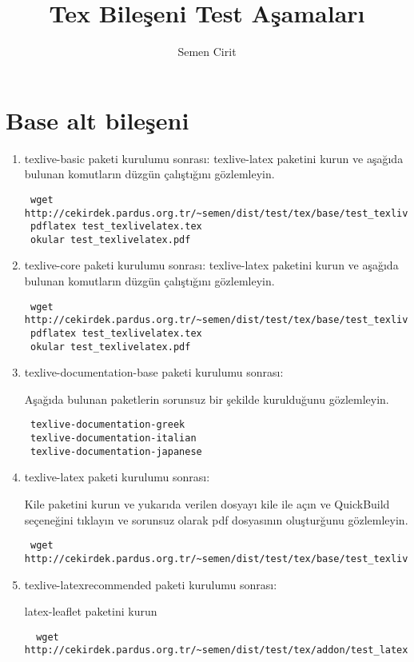 \documentclass[a4paper,10pt]{article}
\title{Tex Bileşeni Test Aşamaları}
\author{Semen Cirit}
\begin{document}
\maketitle

\section{Base alt bileşeni}
\begin{enumerate}
 \item texlive-basic paketi kurulumu sonrası:
 texlive-latex paketini kurun ve aşağıda bulunan komutların düzgün çalıştığını gözlemleyin.

\begin{verbatim}
 wget http://cekirdek.pardus.org.tr/~semen/dist/test/tex/base/test_texlivelatex.tex
 pdflatex test_texlivelatex.tex
 okular test_texlivelatex.pdf
\end{verbatim}

\item texlive-core paketi kurulumu sonrası:
 texlive-latex paketini kurun ve aşağıda bulunan komutların düzgün çalıştığını gözlemleyin.

\begin{verbatim}
 wget http://cekirdek.pardus.org.tr/~semen/dist/test/tex/base/test_texlivelatex.tex
 pdflatex test_texlivelatex.tex
 okular test_texlivelatex.pdf
\end{verbatim}
\item texlive-documentation-base paketi kurulumu sonrası:

Aşağıda bulunan paketlerin sorunsuz bir şekilde kurulduğunu gözlemleyin.	
\begin{verbatim}
 texlive-documentation-greek
 texlive-documentation-italian
 texlive-documentation-japanese
\end{verbatim}
\item texlive-latex paketi kurulumu sonrası:

Kile paketini kurun ve yukarıda verilen dosyayı kile ile açın ve QuickBuild  seçeneğini tıklayın ve sorunsuz olarak pdf dosyasının oluşturğunu gözlemleyin.
\begin{verbatim}
 wget http://cekirdek.pardus.org.tr/~semen/dist/test/tex/base/test_texlivelatex.tex
\end{verbatim}

\item texlive-latexrecommended paketi kurulumu sonrası:

latex-leaflet paketini kurun
\begin{verbatim}
  wget http://cekirdek.pardus.org.tr/~semen/dist/test/tex/addon/test_latexleaflet.tex
\end{verbatim}


\end{enumerate}
\end{document}
